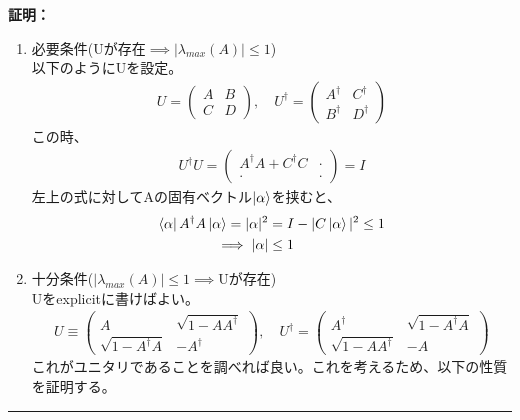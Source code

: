 \documentclass[a4paper,10.5pt]{article}
\numberwithin{equation}{section}
\newenvironment{proofbox}
{\begin{prooflabel}\textbf{証明：}\end{prooflabel}\vspace{0.8em}}
{\par\vspace{1em}\hrule\vspace{1em}}
\begin{document}
\begin{proofbox}
    \begin{enumerate}
        \item 必要条件(Uが存在$\implies |\lambda_{max}(A)|\leq 1 $)\\
        以下のようにUを設定。
        \begin{align*}
            U=\begin{pmatrix}
                A & B\\
                C & D
            \end{pmatrix},\quad 
            U^{\dagger}=\begin{pmatrix}
                A^{\dagger} & C^{\dagger}\\
                B^{\dagger} & D^{\dagger}
            \end{pmatrix}
        \end{align*}
        この時、
        \begin{align*}
            U^{\dagger}U=\begin{pmatrix}
                A^{\dagger}A+C^{\dagger}C & \cdot\\
                \cdot &\cdot
            \end{pmatrix}
            =I
        \end{align*}
        左上の式に対してAの固有ベクトル$\ket{\alpha}$を挟むと、
        \begin{align*}
            \bra{\alpha}A^{\dagger}A\ket{\alpha}=|\alpha|^{2}&=I-|C\ket{\alpha}|^{2}\leq 1\\
            \implies |\alpha|&\leq 1
        \end{align*}
        \item 十分条件($|\lambda_{max}(A)|\leq 1 \implies $Uが存在)\\
        Uをexplicitに書けばよい。
        \begin{align*}
            U\equiv \begin{pmatrix}
                A& \sqrt{1-AA^{\dagger}}\\
                \sqrt{1-A^{\dagger}A}& -A^{\dagger}
            \end{pmatrix},\quad 
            U^{\dagger}=\begin{pmatrix}
                A^{\dagger} & \sqrt{1-A^{\dagger}A}\\ \sqrt{1-AA^{\dagger}} &  -A
            \end{pmatrix}
        \end{align*}
        これがユニタリであることを調べれば良い。これを考えるため、以下の性質を証明する。

\end{enumerate}
\end{proofbox}
\end{document}
